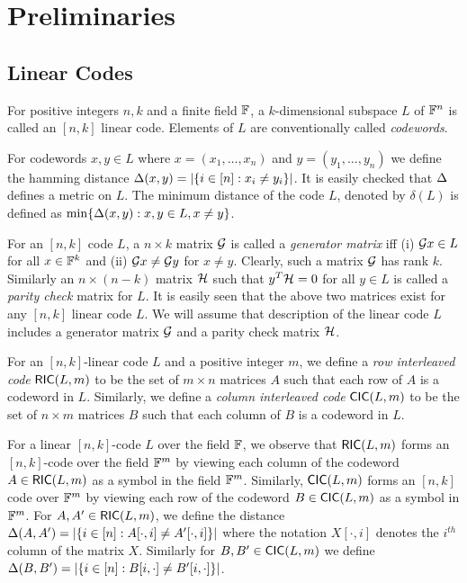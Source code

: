 \section{Preliminaries}
\subsection{Linear Codes}
\begin{definition}\label{defn:lincode}
For positive integers $n,k$ and a finite field $\mathbb{F}$, a $k$-dimensional subspace $L$ of $\mathbb{F}^n$ is called an $[n,k]$ linear code. Elements of $L$ are conventionally called {\em codewords}. 
\end{definition}

For codewords $x,y\in L$ where $x=(x_1,\ldots,x_n)$ and $y=(y_1,\ldots,y_n)$ we define the hamming distance $\Delta(x,y)=|\{i\in [n]: x_i\neq y_i\}|$. It is easily checked that $\Delta$ defines a metric on $L$. The minimum distance of the code $L$, denoted by $\delta(L)$ is defined as $\min\{\Delta(x,y):x,y\in L, x\neq y\}$.

For an $[n,k]$ code $L$, a $n\times k$ matrix $\mathcal{G}$ is called a {\em generator matrix} iff (i) $\mathcal{G} x\in L$ for all $x \in \mathbb{F}^k$ and (ii) $\mathcal{G} x\neq \mathcal{G} y$ for $x\neq y$. Clearly, such a matrix $\mathcal{G}$ has rank $k$. Similarly an $n\times (n-k)$ matrix $\mathcal{H}$ such that $y^T \mathcal{H} = 0$ for all $y\in L$ is called a {\em parity check} matrix for $L$. It is easily seen that the above two matrices exist for any $[n,k]$ linear code $L$. We will assume that description of the linear code $L$ includes a generator matrix $\mathcal{G}$ and a parity check matrix $\mathcal{H}$.

\begin{definition}\label{defn:interleavedcode}
For an $[n,k]$-linear code $L$ and a positive integer $m$, we define a {\em row interleaved code} $\mathsf{RIC}(L,m)$ to be the set of $m\times n$ matrices $A$ such that each row of $A$ is a codeword in $L$. Similarly, we define a {\em column interleaved code} $\mathsf{CIC}(L,m)$ to be the set of $n\times m$ matrices $B$ such that each column of $B$ is a codeword in $L$.
\end{definition}

For a linear $[n,k]$-code $L$ over the field $\mathbb{F}$, we observe that $\mathsf{RIC}(L,m)$ forms an $[n,k]$-code over the field $\mathbb{F}^m$ by viewing each column of the codeword $A\in \mathsf{RIC}(L,m)$ as a symbol in the field $\mathbb{F}^m$. Similarly, $\mathsf{CIC}(L,m)$ forms an $[n,k]$ code over $\mathbb{F}^m$ by viewing each row of the codeword $B\in \mathsf{CIC}(L,m)$ as a symbol in $\mathbb{F}^m$. For $A,A'\in \mathsf{RIC}(L,m)$, we define the distance $\Delta(A,A')=|\{i\in [n]: A[\cdot,i]\neq A'[\cdot,i]\}|$ where the notation $X[\cdot,i]$ denotes the $i^{th}$ column of the matrix $X$. Similarly for $B,B'\in \mathsf{CIC}(L,m)$ we define $\Delta(B,B')=|\{i\in [n]: B[i,\cdot]\neq B'[i,\cdot]\}|$.
 
